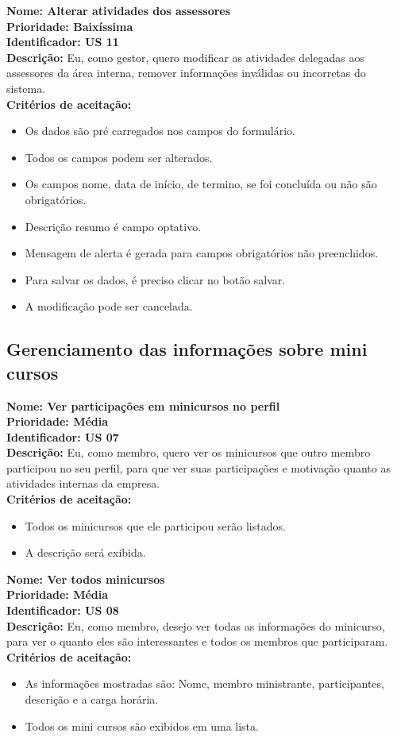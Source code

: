 \begin{anexosenv}
\textbf{Nome: Alterar atividades dos assessores\\
Prioridade: Baixíssima\\
Identificador: US 11\\
Descrição:} Eu, como gestor, quero modificar as atividades delegadas aos assessores da área interna, remover informações inválidas ou incorretas do sistema.\\
\textbf{Critérios de aceitação:}
\begin{itemize}
    \item Os dados são pré carregados nos campos do formulário.
    \item Todos os campos podem ser alterados.
    \item Os campos nome, data de início, de termino, se foi concluída ou não são obrigatórios.
    \item Descrição resumo é campo optativo.
    \item Mensagem de alerta é gerada para campos obrigatórios não preenchidos.
    \item Para salvar os dados, é preciso clicar no botão salvar.
    \item A modificação pode ser cancelada.
\end{itemize}

\subsection{Gerenciamento das informações sobre mini cursos}

\textbf{Nome: Ver participações em minicursos no perfil\\
Prioridade: Média\\
Identificador: US 07\\
Descrição:} Eu, como membro, quero ver os minicursos que outro membro participou no seu perfil, para que ver suas participações e motivação quanto as atividades internas da empresa.\\
\textbf{Critérios de aceitação:}
\begin{itemize}
    \item Todos os minicursos que ele participou serão listados.
    \item A descrição será exibida.
\end{itemize}

\textbf{Nome: Ver todos minicursos\\
Prioridade: Média\\
Identificador: US 08\\
Descrição:} Eu, como membro, desejo ver todas as informações do minicurso, para ver o quanto eles são interessantes e todos os membros que participaram.\\
\textbf{Critérios de aceitação:}
\begin{itemize}
    \item As informações mostradas são: Nome, membro ministrante, participantes, descrição e a carga horária.
    \item Todos os mini cursos são exibidos em uma lista.
\end{itemize}


\end{anexosenv}
